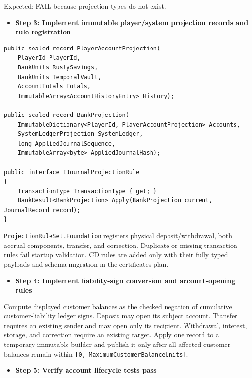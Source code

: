 \documentclass[
  10pt,
  letterpaper,
]{article}
\providecommand{\tightlist}{%
  \setlength{\itemsep}{0pt}\setlength{\parskip}{0pt}}
\begin{document}
Expected: FAIL because projection types do not exist.

\begin{itemize}
\tightlist
\item[$\square$]
  \textbf{Step 3: Implement immutable player/system projection records
  and rule registration}
\end{itemize}

\begin{lstlisting}
public sealed record PlayerAccountProjection(
    PlayerId PlayerId,
    BankUnits RustySavings,
    BankUnits TemporalVault,
    AccountTotals Totals,
    ImmutableArray<AccountHistoryEntry> History);

public sealed record BankProjection(
    ImmutableDictionary<PlayerId, PlayerAccountProjection> Accounts,
    SystemLedgerProjection SystemLedger,
    long AppliedJournalSequence,
    ImmutableArray<byte> AppliedJournalHash);

public interface IJournalProjectionRule
{
    TransactionType TransactionType { get; }
    BankResult<BankProjection> Apply(BankProjection current, JournalRecord record);
}
\end{lstlisting}

\texttt{ProjectionRuleSet.}\allowbreak{}\texttt{Foundation} registers
physical deposit/withdrawal, both accrual components, transfer, and
correction. Duplicate or missing transaction rules fail startup
validation. CD rules are added only with their fully typed payloads and
schema migration in the certificates plan.

\begin{itemize}
\tightlist
\item[$\square$]
  \textbf{Step 4: Implement liability-sign conversion and
  account-opening rules}
\end{itemize}

Compute displayed customer balances as the checked negation of
cumulative customer-liability ledger signs. Deposit may open its subject
account. Transfer requires an existing sender and may open only its
recipient. Withdrawal, interest, storage, and correction require an
existing target. Apply one record to a temporary immutable builder and
publish it only after all affected customer balances remain within
\texttt{[0,}\allowbreak{}\texttt{\ }\allowbreak{}\texttt{MaximumCustomerBalanceUnits]}.

\begin{itemize}
\tightlist
\item[$\square$]
  \textbf{Step 5: Verify account lifecycle tests pass}
\end{itemize}
\end{document}
